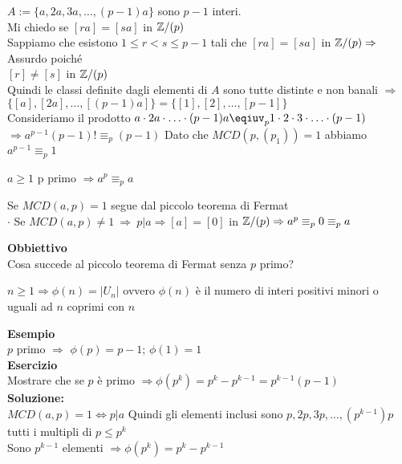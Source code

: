 \documentclass[12px]{article}
\begin{document}
\begin{dimo}
	$A:=\{a,2a,3a,\ldots,(p-1)a\}$ sono $p-1$ interi.\\
	Mi chiedo se $[ra] = [sa]$ in $\mathbb{Z}/(p)$\\
	Sappiamo che esistono  $1\leq r < s \leq p-1$ tali che  $[ra] = [sa]$ in $\mathbb{Z}/(p) \Rightarrow $ Assurdo poiché \\
	$[r]\neq [s]$ in $\mathbb{Z}/(p)$\\
	Quindi le classi  definite dagli elementi di $A$ sono tutte distinte e non banali $ \Rightarrow $ $\{[a],[2a], \ldots, [(p-1)a]\} = \{[1],[2],\ldots,[p-1]\}$\\
	Consideriamo il prodotto  $a\cdot 2a\cdot\ldots\cdot (p-1)a\eqiuv_p 1\cdot 2 \cdot 3 \cdot \ldots \cdot (p-1)$\\
	$ \Rightarrow a^{p-1}(p-1)!\equiv_p (p-1)$ Dato che $MCD(p,(p_1)) = 1$ abbiamo $a^{p-1}\equiv_p 1$
\end{dimo}
	 \begin{coro}
		$a\geq 1 $ p primo $ \Rightarrow a^p \equiv_p a$ \\
	\end{coro}
	\begin{dimo}
		Se $MCD(a,p) = 1 $ segue dal piccolo teorema di Fermat\\
		$\cdot$ Se  $MCD(a,p)\neq 1 \ \Rightarrow  \ p|a \Rightarrow [a] = [0] $  in $\mathbb{Z}/(p) \Rightarrow a^p\equiv_p 0\equiv_p a$ \\
	\end{dimo}
	\textbf{Obbiettivo}\\
	Cosa succede al piccolo teorema di Fermat senza $p$ primo?
	\begin{defi}
		$n\geq 1 \Rightarrow \phi(n) = |U_n|$ ovvero $\phi(n)$ è il numero di interi positivi minori o uguali ad  $n$ coprimi con $n$
	\end{defi}
	\textbf{Esempio}\\
	$p$ primo $ \Rightarrow $  $\phi(p) = p-1$;  $\phi (1) = 1$\\
	 \textbf{Esercizio}\\
	 Mostrare che se $ p $ è primo $ \Rightarrow  \phi (p^k) = p^k - p^{k-1} = p^{k-1}(p-1)$ \\
	 \textbf{Soluzione:}\\
	 $MCD(a,p) = 1 \Leftrightarrow p | a$ Quindi gli elementi inclusi sono $p,2p,3p,\ldots, (p^{k-1})p $ tutti i multipli di $p \leq p^k$\\
	 Sono  $ p^{k-1}$ elementi $ \Rightarrow \phi (p^k) = p^k - p^{k-1}$ \\
\end{document}
